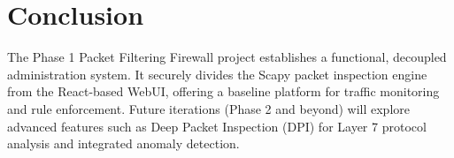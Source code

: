 \documentclass[12pt, a4paper]{article}
\begin{document}
\section{Conclusion}
The Phase 1 Packet Filtering Firewall project establishes a functional, decoupled administration system. It securely divides the Scapy packet inspection engine from the React-based WebUI, offering a baseline platform for traffic monitoring and rule enforcement. Future iterations (Phase 2 and beyond) will explore advanced features such as Deep Packet Inspection (DPI) for Layer 7 protocol analysis and integrated anomaly detection.
\end{document}
